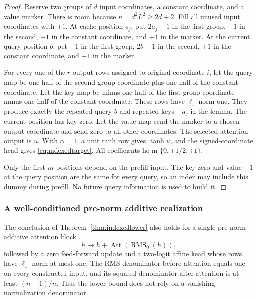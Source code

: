 \begin{proof}
Reserve two groups of $d$ input coordinates, a constant coordinate,
and a value marker.  There is room because
$n=d^2L^2\ge2d+2$.  Fill all unused input coordinates with $+1$.
At cache position $a_j$, put $2a_j-1$ in the first group, $-1$ in
the second, $+1$ in the constant coordinate, and $+1$ in the marker.
At the current query position $b$, put $-1$ in the first group,
$2b-1$ in the second, $+1$ in the constant coordinate, and $-1$ in
the marker.

For every one of the $r$ output rows assigned to original coordinate
$i$, let the query map be one half of the second-group coordinate
plus one half of the constant coordinate.  Let the key map be minus
one half of the first-group coordinate minus one half of the constant
coordinate.  These rows have $\ell_1$ norm one.  They produce exactly
the repeated query $b$ and repeated keys $-a_j$ in the lemma.
The current position has key zero.  Let the value map send the marker
to a chosen output coordinate and send zero to all other coordinates.
The selected attention output is $u$.  With $\alpha=1$, a unit tanh
row gives $\tanh u$, and the signed-coordinate head gives
\eqref{eq:indexedtarget}.  All coefficients lie in
$\{0,\pm1/2,\pm1\}$.

Only the first $m$ positions depend on the prefill input.  The key zero
and value $-1$ at the query position are the same for every query, so
an index may include this dummy during prefill.  No future query
information is used to build it.
\end{proof}

\subsubsection{A well-conditioned pre-norm additive realization}

\begin{corollary}
\label{cor:indexedprenorm}
The conclusion of Theorem~\ref{thm:indexedlower} also holds for a
single pre-norm additive attention block
\[
 h\longmapsto h+\operatorname{Att}(\operatorname{RMS}_0(h)),
\]
followed by a zero feed-forward update and a two-logit affine head
whose rows have $\ell_1$ norm at most one.  The RMS denominator before
attention equals one on every constructed input, and its squared
denominator after attention is at least $(n-1)/n$.  Thus the lower
bound does not rely on a vanishing normalization denominator.
\end{corollary}

